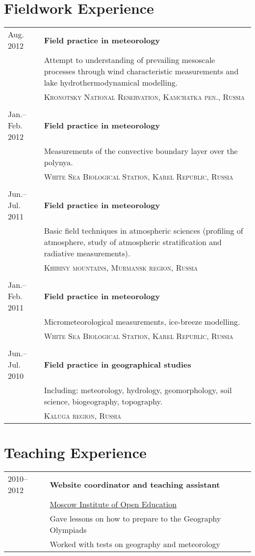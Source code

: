 \documentclass[a4paper,10pt]{article}
\newlength{\mycol}
\begin{document}
\section{Fieldwork Experience}
\begin{tabu} to 
 {\small Aug.} 2012 & \textbf{Field practice in meteorology} \\
& Attempt to understanding of prevailing mesoscale processes through wind characteristic measurements and lake hydrothermodynamical modelling. \\
& \textsc{Kronotsky National Reservation, Kamchatka pen., Russia}\\
 \\

 {\small Jan.--Feb.} 2012 & \textbf{Field practice in meteorology} \\
& Measurements of the convective boundary layer over the polynya. \\
& \textsc{White Sea Biological Station, Karel Republic, Russia}\\
 \\

 {\small Jun.--Jul.} 2011 & \textbf{Field practice in meteorology} \\
& Basic field techniques in atmospheric sciences (profiling of atmosphere, study of atmospheric stratification and radiative measurements).  \\
& \textsc{Khibiny mountains, Murmansk region, Russia}\\
 \\

 {\small Jan.--Feb.} 2011 & \textbf{Field practice in meteorology} \\
& Micrometeorological measurements, ice-breeze modelling. \\
& \textsc{White Sea Biological Station, Karel Republic, Russia}\\
 \\

 {\small Jun.--Jul.} 2010 & \textbf{Field practice in geographical studies} \\
& Including: meteorology, hydrology, geomorphology, soil science, biogeography, topography. \\
& \textsc{Kaluga region, Russia}
\end{tabu}

\section{Teaching Experience}
\begin{tabu} to 
	2010--2012 & \textbf{Website coordinator and teaching assistant} \\
& \href{http://www.mioo.ru/}{Moscow Institute of Open Education} \\
& Gave lessons on how to prepare to the Geography Olympiads \\
& Worked with tests on geography and meteorology
\end{tabu}
\end{document}
